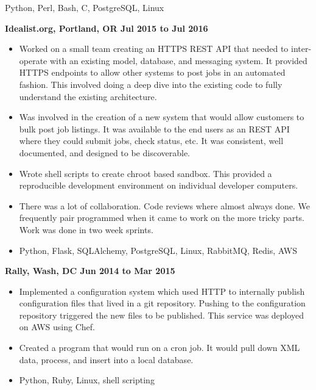 \documentclass{res}
\begin{document}
\begin{resume}
\begin{itemize}
    Python, Perl, Bash, C, PostgreSQL, Linux

  \end{itemize}

  {\large \bf Idealist.org, Portland, OR \hfill Jul 2015 to Jul 2016}

  \begin{itemize} \item
    Worked on a small team creating an HTTPS REST API that needed
    to inter-operate with an existing model, database, and messaging
    system. It provided HTTPS endpoints to allow other systems to post
    jobs in an automated fashion.  This involved doing
    a deep dive into the existing code to fully understand the existing
    architecture.

    \item

    Was involved in the creation of a new system that would allow
    customers to bulk post job listings.  It was available to the end users
    as an REST API where they could submit jobs, check status, etc.
    It was consistent, well documented, and designed to be discoverable.

  \item

    Wrote shell scripts to create chroot based sandbox.  This provided
    a reproducible development environment on individual developer
    computers.

    \item

    There was a lot of collaboration.  Code reviews where almost always
    done.  We frequently pair programmed when it came to work on the
    more tricky parts.  Work was done in two week sprints.

  \item

    Python, Flask, SQLAlchemy, PostgreSQL, Linux, RabbitMQ, Redis, AWS

  \end{itemize}

  {\large \bf Rally, Wash, DC \hfill Jun 2014 to Mar 2015}

  \begin{itemize}

  \item
    Implemented a configuration system which used HTTP to
    internally publish configuration files that lived in a git repository.
    Pushing to the configuration repository triggered the new files
    to be published.  This service was deployed on AWS using Chef.
  \item
    Created a program that would run on a cron job.  It would pull down
    XML data, process, and insert into a local database.
  \item
    Python, Ruby, Linux, shell scripting


\end{itemize}
\end{resume}
\end{document}
